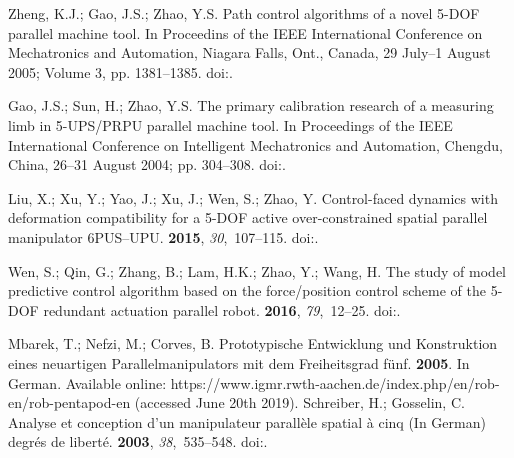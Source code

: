 \documentclass[robotics,article,accept,moreauthors,pdftex]{Definitions/mdpi}
\begin{document}
\begin{thebibliography}{999}
Zheng, K.J.; Gao, J.S.; Zhao, Y.S.
\newblock Path control algorithms of a novel 5-DOF parallel machine tool.
\newblock  In Proceedins of the IEEE International Conference on Mechatronics and Automation, Niagara Falls, Ont., Canada, 29 July--1 August 2005; Volume 3, pp. 1381--1385.
\newblock
  doi:{\href{https://doi.org/10.1109/ICMA.2005.1626755}{}}.

Gao, J.S.; Sun, H.; Zhao, Y.S.
\newblock The primary calibration research of a measuring limb in 5-UPS/PRPU
  parallel machine tool.
\newblock  In Proceedings of the IEEE International Conference on Intelligent Mechatronics and Automation, Chengdu, China, 26--31 August 2004; pp. 304--308.
\newblock
  doi:{\href{https://doi.org/10.1109/ICIMA.2004.1384209}{}}.

Liu, X.; Xu, Y.; Yao, J.; Xu, J.; Wen, S.; Zhao, Y.
\newblock Control-faced dynamics with deformation compatibility for a 5-DOF
  active over-constrained spatial parallel manipulator 6PUS--UPU.
 {\bf 2015}, {\em 30},~107--115.
\newblock
  doi:{\href{https://doi.org/10.1016/j.mechatronics.2015.06.014}{}}.

Wen, S.; Qin, G.; Zhang, B.; Lam, H.K.; Zhao, Y.; Wang, H.
\newblock The study of model predictive control algorithm based on the
  force/position control scheme of the 5-DOF redundant actuation parallel
  robot.
 {\bf 2016}, {\em 79},~12--25.
\newblock
  doi:{\href{https://doi.org/10.1016/j.robot.2016.02.002}{}}.

Mbarek, T.; Nefzi, M.; Corves, B.
\newblock Prototypische Entwicklung und Konstruktion eines neuartigen
  Parallelmanipulators mit dem Freiheitsgrad fünf.
 {\bf 2005}.
\newblock In German. Available online:
  https://www.igmr.rwth-aachen.de/index.php/en/rob-en/rob-pentapod-en (accessed
  June 20th 2019).
Schreiber, H.; Gosselin, C.
\newblock Analyse et conception d’un manipulateur parallèle spatial à cinq (In German)
  degrés de liberté.
 {\bf 2003}, {\em 38},~535--548.
\newblock
  doi:{\href{https://doi.org/10.1016/S0094-114X(03)00007-7}{}}.


\end{thebibliography}
\end{document}
